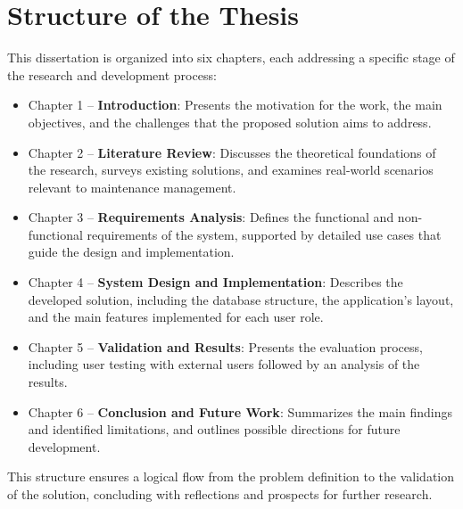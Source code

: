 \section{Structure of the Thesis}


This dissertation is organized into six chapters, each addressing a specific stage of the research and development process:


\begin{itemize}
    \item Chapter 1 – \textbf{Introduction}: Presents the motivation for the work, the main objectives, and the challenges that the proposed solution aims to address.
    \item Chapter 2 – \textbf{Literature Review}: Discusses the theoretical foundations of the research, surveys existing solutions, and examines real-world scenarios relevant to maintenance management.
    \item Chapter 3 – \textbf{Requirements Analysis}: Defines the functional and non-functional requirements of the system, supported by detailed use cases that guide the design and implementation.
    \item Chapter 4 – \textbf{System Design and Implementation}: Describes the developed solution, including the database structure, the application's layout, and the main features implemented for each user role.
    \item Chapter 5 – \textbf{Validation and Results}: Presents the evaluation process, including user testing with external users followed by an analysis of the results.
    \item Chapter 6 – \textbf{Conclusion and Future Work}: Summarizes the main findings and identified limitations, and outlines possible directions for future development.
\end{itemize}

This structure ensures a logical flow from the problem definition to the validation of the solution, concluding with reflections and prospects for further research.

